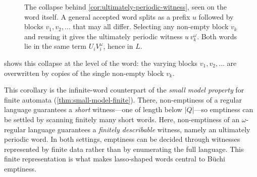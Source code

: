 \begin{figure}[ht]
\centering
{}
\caption{The collapse behind \cref{cor:ultimately-periodic-witness}, seen
on the word itself.  A general accepted word splits as a prefix $u$
followed by blocks $v_1,v_2,\dots$ that may all differ.  Selecting any
non-empty block $v_k$ and reusing it gives the ultimately periodic witness
$u\,v_k^\omega$.  Both words lie in the same term $U_iV_i^\omega$, hence
in $L$.}
\label{fig:up-collapse}
\end{figure}

 shows this collapse at the level of the word: the
varying blocks $v_1,v_2,\dots$ are overwritten by copies of the single
non-empty block $v_k$.

This corollary is the infinite-word counterpart of the \emph{small model
property} for finite automata (\cref{thm:small-model-finite}).  There,
non-emptiness of a regular language guarantees a \emph{short}
witness---one of length below $|Q|$---so emptiness can be settled by
scanning finitely many short words.  Here, non-emptiness of an
$\omega$-regular language guarantees a \emph{finitely describable}
witness, namely an ultimately periodic word.  In both settings, emptiness
can be decided through witnesses represented by finite data rather than by
enumerating the full language.  This finite representation is what makes
lasso-shaped words central to B\"uchi emptiness.

